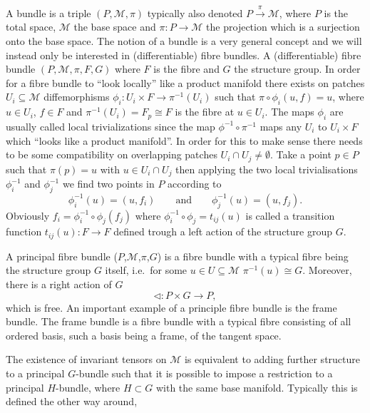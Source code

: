A bundle is a triple $(P,\mathcal{M},\pi)$ typically also denoted $P\overset{\pi}{\longrightarrow}\mathcal{M}$, where $P$ is the total space, $\mathcal{M}$ the base space and $\pi: P\to \mathcal{M}$ the projection which is a surjection onto the base space. The notion of a bundle is a very general concept and we will instead only be interested in (differentiable) fibre bundles. A (differentiable) fibre bundle $(P,\mathcal{M},\pi,F,G)$ where $F$ is the fibre and $G$ the structure group. In order for a fibre bundle to ``look locally'' like a product manifold there exists on patches $U_i\subseteq \mathcal{M}$ diffemorphisms $\phi_i: U_i\times F\to \pi^{-1}(U_i)$ such that $\pi\circ \phi_i(u,f)=u$, where $u\in U_i$, $f\in F$ and $\pi^{-1}(U_i)=F_p\cong F$ is the fibre at $u\in U_i$. The maps $\phi_i$ are usually called local trivializations since the map $\phi^{-1}\circ \pi^{-1}$ maps any $U_i$ to $U_i\times F$ which ``looks like a product manifold''. In order for this to make sense there needs to be some compatibility on overlapping patches $U_i\cap U_j\neq \emptyset$. Take a point $p\in P$ such that $\pi(p)=u$ with $u\in U_i\cap U_j$ then applying the two local trivialisations $\phi^{-1}_i$ and $\phi^{-1}_j$ we find two points in $P$ according to 
\begin{equation}
    \phi^{-1}_i(u) = (u,f_i)\qquad \text{and}\qquad \phi^{-1}_j(u) = (u,f_j).
\end{equation}
Obviously $f_i = \phi^{-1}_i\circ \phi_j (f_j)$ where $\phi^{-1}_i\circ \phi_j = t_{ij}(u)$ is called a transition function $t_{ij}(u):F\to F$ defined trough a left action of the structure group $G$. 

A principal fibre bundle ($P$,$\mathcal{M}$,$\pi$,$G$) is a fibre bundle with a typical fibre being the structure group $G$ itself, i.e.\ for some $u\in U\subseteq \mathcal{M}$ $\pi^{-1}(u)\cong G$. Moreover, there is a right action of $G$
\begin{equation}
    \triangleleft: P\times G \to P,
\end{equation}
which is free. An important example of a principle fibre bundle is the frame bundle. The frame bundle is a fibre bundle with a typical fibre consisting of all ordered basis, such a basis being a frame, of the tangent space. 

The existence of invariant tensors on $\mathcal{M}$ is equivalent to adding further structure to a principal $G$-bundle such that it is possible to impose a restriction to a principal $H$-bundle, where $H\subset G$ with the same base manifold. Typically this is defined the other way around,  


